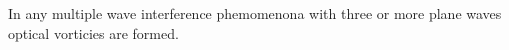 In any multiple wave interference phemomenona with three or more plane
waves optical vorticies are formed.  


